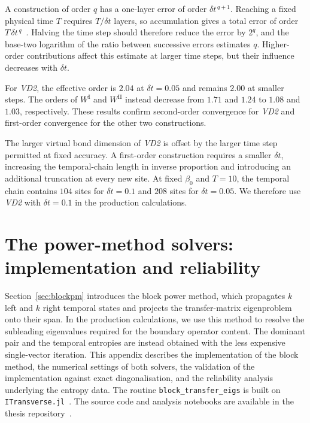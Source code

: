 A construction of order $q$ has a one-layer error of order $\delta t^{\,q+1}$. Reaching a fixed physical time $T$ requires $T/\delta t$ layers, so accumulation gives a total error of order $T\,\delta t^{\,q}$~\cite{paeckel2019}. Halving the time step should therefore reduce the error by $2^q$, and the base-two logarithm of the ratio between successive errors estimates $q$. Higher-order contributions affect this estimate at larger time steps, but their influence decreases with $\delta t$.

For \textit{VD2}, the effective order is $2.04$ at $\delta t=0.05$ and remains $2.00$ at smaller steps. The orders of $W^{\mathrm{I}}$ and $W^{\mathrm{II}}$ instead decrease from $1.71$ and $1.24$ to $1.08$ and $1.03$, respectively. These results confirm second-order convergence for \textit{VD2} and first-order convergence for the other two constructions.

The larger virtual bond dimension of \textit{VD2} is offset by the larger time step permitted at fixed accuracy. A first-order construction requires a smaller $\delta t$, increasing the temporal-chain length in inverse proportion and introducing an additional truncation at every new site. At fixed $\beta_0$ and $T=10$, the temporal chain contains $104$ sites for $\delta t=0.1$ and $208$ sites for $\delta t=0.05$. We therefore use \textit{VD2} with $\delta t=0.1$ in the production calculations.



\FloatBarrier
\section{The power-method solvers: implementation and reliability}
\label{app:blockpm}

Section~\ref{sec:blockpm} introduces the block power method, which propagates $k$ left and $k$ right temporal states and projects the transfer-matrix eigenproblem onto their span. In the production calculations, we use this method to resolve the subleading eigenvalues required for the boundary operator content. The dominant pair and the temporal entropies are instead obtained with the less expensive single-vector iteration. This appendix describes the implementation of the block method, the numerical settings of both solvers, the validation of the implementation against exact diagonalisation, and the reliability analysis underlying the entropy data. The routine \texttt{block\_transfer\_eigs} is built on \texttt{ITransverse.jl}~\cite{carignano2025itransverse}. The source code and analysis notebooks are available in the thesis repository~\cite{marquezolguin2026code}.

